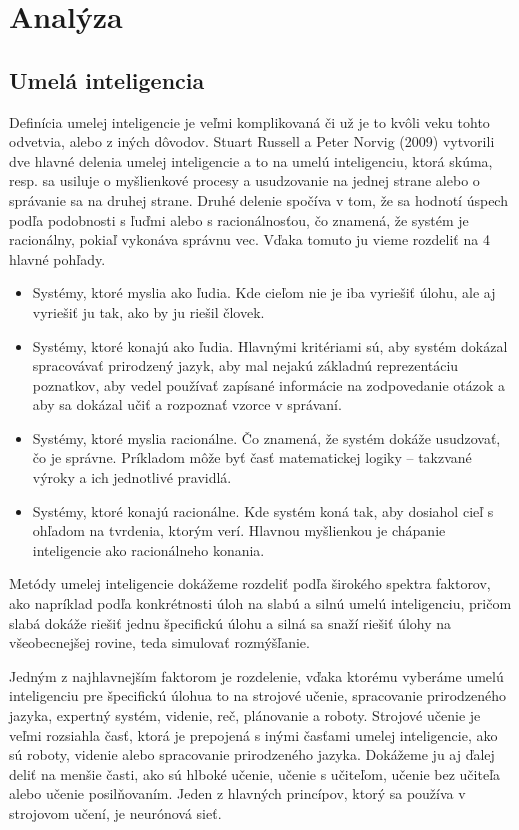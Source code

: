 \chapter{Analýza}

\section{Umelá inteligencia}
\hspace{10mm}Definícia umelej inteligencie je veľmi komplikovaná či už je to kvôli veku tohto odvetvia, alebo z iných dôvodov. Stuart Russell a Peter Norvig (2009) vytvorili dve hlavné delenia umelej inteligencie a to na umelú inteligenciu, ktorá skúma, resp. sa usiluje o myšlienkové procesy a usudzovanie na jednej strane alebo o správanie sa na druhej strane. Druhé delenie spočíva v tom, že sa hodnotí úspech podľa podobnosti s ľuďmi alebo s racionálnosťou, čo znamená, že systém je racionálny, pokiaľ vykonáva správnu vec. Vďaka tomuto ju vieme rozdeliť na 4 hlavné pohľady.
\begin{itemize}
     \item Systémy, ktoré myslia ako ľudia. Kde cieľom nie je iba vyriešiť úlohu, ale aj vyriešiť ju  tak, ako by ju riešil človek.
    \item Systémy, ktoré konajú ako ľudia. Hlavnými kritériami sú, aby systém dokázal spracovávať prirodzený jazyk, aby mal nejakú základnú reprezentáciu poznatkov, aby vedel používať zapísané informácie na zodpovedanie otázok a aby sa dokázal učiť a rozpoznať vzorce v správaní.
    \item Systémy, ktoré myslia racionálne. Čo znamená, že systém dokáže usudzovať, čo je správne. Príkladom môže byť časť matematickej logiky – takzvané  výroky a ich jednotlivé pravidlá.
    \item Systémy, ktoré konajú racionálne. Kde systém koná tak, aby dosiahol cieľ s ohľadom na tvrdenia, ktorým verí. Hlavnou myšlienkou je chápanie inteligencie ako racionálneho konania.
\end{itemize}
\cite{Umela-inteligencia}

\hspace{10mm}Metódy umelej inteligencie dokážeme rozdeliť podľa širokého spektra faktorov, ako napríklad podľa konkrétnosti úloh  na slabú a silnú umelú inteligenciu, pričom slabá dokáže riešiť jednu špecifickú úlohu a silná sa snaží riešiť úlohy na všeobecnejšej rovine, teda simulovať rozmýšľanie.

\hspace{10mm}Jedným z najhlavnejším faktorom je rozdelenie, vďaka ktorému vyberáme umelú inteligenciu pre špecifickú úlohua to na strojové učenie, spracovanie prirodzeného jazyka, expertný systém, videnie, reč, plánovanie a roboty. Strojové učenie je veľmi rozsiahla časť, ktorá je prepojená s inými časťami umelej inteligencie, ako sú roboty, videnie alebo spracovanie prirodzeného jazyka. Dokážeme ju aj ďalej deliť  na menšie časti, ako sú hlboké učenie, učenie s učiteľom, učenie bez učiteľa alebo učenie posilňovaním. Jeden z hlavných princípov, ktorý sa používa v strojovom učení, je neurónová sieť. \cite{Goodfellow-et-al-2016, type-of-ai}


